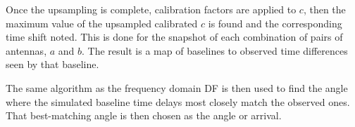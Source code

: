 Once the upsampling is complete, calibration factors are applied to \(c\), then the maximum value of the upsampled calibrated \(c\) is found and the corresponding time shift noted. This is done for the snapshot of each combination of pairs of antennas, \(a\) and \(b\). The result is a map of baselines to observed time differences seen by that baseline.

The same algorithm as the frequency domain DF is then used to find the angle where the simulated baseline time delays most closely match the observed ones. That best-matching angle is then chosen as the angle or arrival.



